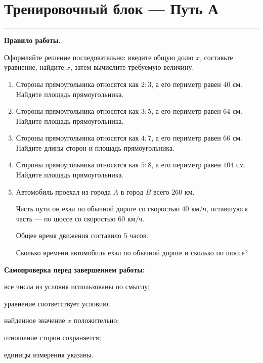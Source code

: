 \documentclass[a4paper,12pt]{article}
\newcommand{\sectionline}{%
  \par
  \noindent
  \color{accent}\rule{\linewidth}{0.45pt}
  \color{textgray}
  \par
}
\begin{document}
\clearpage


\section*{Тренировочный блок --- Путь А}
\sectionline

\textbf{Правило работы.}

Оформляйте решение последовательно: введите общую долю $x$, составьте уравнение, найдите $x$, затем вычислите требуемую величину.

\begin{enumerate}
  \item
  Стороны прямоугольника относятся как $2:3$, а его периметр равен $40$ см. Найдите площадь прямоугольника.

  \item
  Стороны прямоугольника относятся как $3:5$, а его периметр равен $64$ см. Найдите площадь прямоугольника.

  \item
  Стороны прямоугольника относятся как $4:7$, а его периметр равен $66$ см. Найдите длины сторон и площадь прямоугольника.

  \item
  Стороны прямоугольника относятся как $5:8$, а его периметр равен $104$ см. Найдите площадь прямоугольника.

  \item
  Автомобиль проехал из города $A$ в город $B$ всего $260$ км.

  Часть пути он ехал по обычной дороге со скоростью $40$ км/ч, оставшуюся часть --- по шоссе со скоростью $60$ км/ч.

  Общее время движения составило $5$ часов.

  Сколько времени автомобиль ехал по обычной дороге и сколько по шоссе?
\end{enumerate}

\vfill

\begin{keybox}
\textbf{Самопроверка перед завершением работы:}

все числа из условия использованы по смыслу;

уравнение соответствует условию;

найденное значение $x$ положительно;

отношение сторон сохраняется;

единицы измерения указаны.
\end{keybox}
\end{document}
